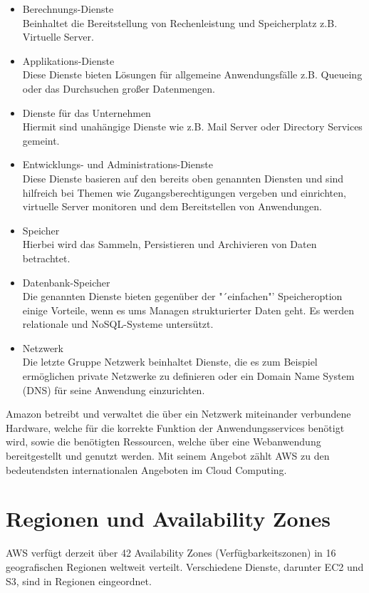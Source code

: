{\begin{itemize}
  \item Berechnungs-Dienste
  \\ Beinhaltet die Bereitstellung von Rechenleistung und Speicherplatz z.B. Virtuelle Server.
  \item Applikations-Dienste
  \\ Diese Dienste bieten Lösungen für allgemeine Anwendungsfälle z.B. Queueing oder das Durchsuchen großer Datenmengen.
  \item Dienste für das Unternehmen
  \\ Hiermit sind unahängige Dienste wie z.B. Mail Server oder Directory Services gemeint.
  \item Entwicklungs- und Administrations-Dienste
  \\ Diese Dienste basieren auf den bereits oben genannten Diensten und sind hilfreich bei Themen wie Zugangsberechtigungen vergeben und einrichten, virtuelle Server monitoren und dem Bereitstellen von Anwendungen.
  \item Speicher
  \\ Hierbei wird das Sammeln, Persistieren und Archivieren von Daten betrachtet.
  \item Datenbank-Speicher
  \\ Die genannten Dienste bieten gegenüber der "´einfachen"' Speicheroption einige Vorteile, wenn es ums Managen strukturierter Daten geht. Es werden relationale und NoSQL-Systeme untersützt.
  \item Netzwerk
  \\ Die letzte Gruppe Netzwerk beinhaltet Dienste, die es zum Beispiel ermöglichen private Netzwerke zu definieren oder ein Domain Name System (DNS) für seine Anwendung einzurichten.
\end{itemize} \cite{wittig:awsinaction}

Amazon betreibt und verwaltet
die über ein Netzwerk miteinander verbundene Hardware, welche für die korrekte
Funktion der Anwendungsservices benötigt wird, sowie die benötigten Ressourcen,
welche über eine Webanwendung bereitgestellt und genutzt werden. Mit seinem Angebot
zählt AWS zu den bedeutendsten internationalen Angeboten im Cloud Computing.

\section{Regionen und Availability Zones}
AWS verfügt derzeit über 42 Availability Zones (Verfügbarkeitszonen) in 16 geografischen Regionen weltweit verteilt. Verschiedene Dienste, darunter EC2 und S3, sind in Regionen eingeordnet.

}
